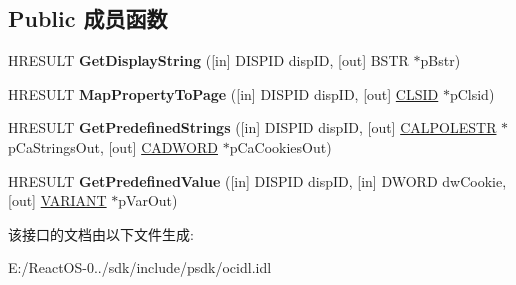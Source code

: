 \subsection*{Public 成员函数}
\begin{DoxyCompactItemize}
\item 
\mbox{\label{interface_i_per_property_browsing_a06b1bbe4ffd08fed2706dcc790af586d}} 
H\+R\+E\+S\+U\+LT {\bfseries Get\+Display\+String} (\mbox{[}in\mbox{]} D\+I\+S\+P\+ID disp\+ID, \mbox{[}out\mbox{]} B\+S\+TR $\ast$p\+Bstr)
\item 
\mbox{\label{interface_i_per_property_browsing_a39f9102625b230254538939ef2419a99}} 
H\+R\+E\+S\+U\+LT {\bfseries Map\+Property\+To\+Page} (\mbox{[}in\mbox{]} D\+I\+S\+P\+ID disp\+ID, \mbox{[}out\mbox{]} \hyperlink{struct___i_i_d}{C\+L\+S\+ID} $\ast$p\+Clsid)
\item 
\mbox{\label{interface_i_per_property_browsing_a551500e8dce0c74b2c3322c21a2df9f2}} 
H\+R\+E\+S\+U\+LT {\bfseries Get\+Predefined\+Strings} (\mbox{[}in\mbox{]} D\+I\+S\+P\+ID disp\+ID, \mbox{[}out\mbox{]} \hyperlink{struct_i_per_property_browsing_1_1tag_c_a_l_p_o_l_e_s_t_r}{C\+A\+L\+P\+O\+L\+E\+S\+TR} $\ast$p\+Ca\+Strings\+Out, \mbox{[}out\mbox{]} \hyperlink{struct_i_per_property_browsing_1_1tag_c_a_d_w_o_r_d}{C\+A\+D\+W\+O\+RD} $\ast$p\+Ca\+Cookies\+Out)
\item 
\mbox{\label{interface_i_per_property_browsing_a5eb0007e9dc32144dfbcbfd0c19e1a9a}} 
H\+R\+E\+S\+U\+LT {\bfseries Get\+Predefined\+Value} (\mbox{[}in\mbox{]} D\+I\+S\+P\+ID disp\+ID, \mbox{[}in\mbox{]} D\+W\+O\+RD dw\+Cookie, \mbox{[}out\mbox{]} \hyperlink{structtag_v_a_r_i_a_n_t}{V\+A\+R\+I\+A\+NT} $\ast$p\+Var\+Out)
\end{DoxyCompactItemize}


该接口的文档由以下文件生成\+:\begin{DoxyCompactItemize}
\item 
E\+:/\+React\+O\+S-\/0../sdk/include/psdk/ocidl.\+idl\end{DoxyCompactItemize}
